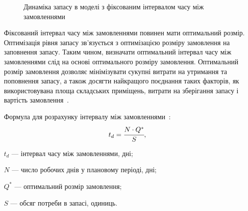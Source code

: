 \begin{figure}[H]
  \centering
{}
  \captionsetup{justification=centering}
  \caption{Динаміка запасу в моделі з фіксованим інтервалом часу між замовленнями}
  \label{fig:model_fi:dynamic}
\end{figure}

Фіксований інтервал часу між замовленнями повинен мати оптимальний розмір. 
Оптимізація рівня запасу зв'язується з оптимізацією розміру замовлення на заповнення запасу. 
Таким чином, визначати оптимальний інтервал часу між замовленнями слід на основі оптимального розміру замовлення. 
Оптимальний розмір замовлення дозволяє мінімізувати сукупні витрати на утримання та поповнення запасу, а також досягти найкращого поєднання таких факторів, як використовувана площа складських приміщень, витрати на зберігання запасу і вартість замовлення~\cite{Sterligova2008}.

Формула для розрахунку інтервалу між замовленнями~\cite{Sterligova2008}:
\begin{equation} \label{eq:model_fi:time}
t_d=\cfrac{N\cdot Q^*}{S}
,
\end{equation}
\begin{description}
	\item[де] $t_d$ --- інтервал часу між замовленнями, дні;
	\item $N$ --- число робочих днів у плановому періоді, дні;
	\item $Q^*$ --- оптимальний розмір замовлення;
	\item $S$ --- обсяг потреби в запасі, одиниць.
\end{description}

